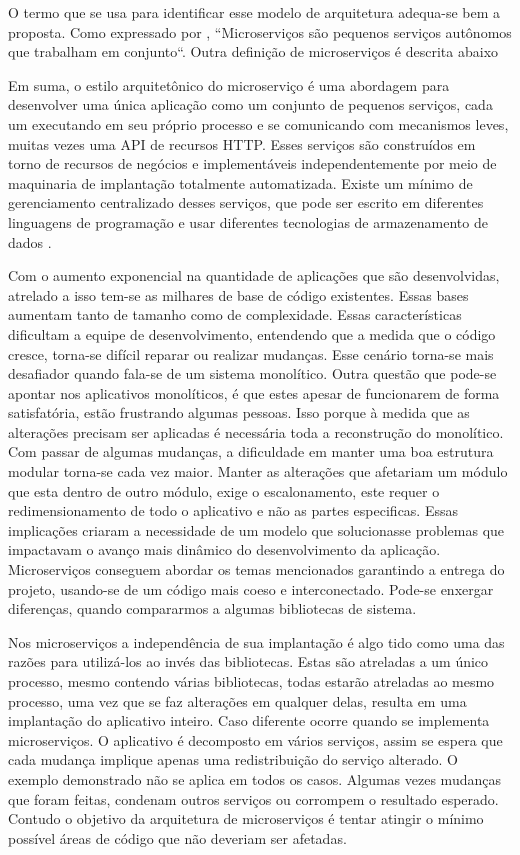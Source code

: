 O termo que se usa para identificar esse modelo de arquitetura adequa-se bem a proposta.
Como expressado por
\cite{building-microservices}, ``Microserviços são pequenos serviços autônomos que trabalham em conjunto``.
Outra definição de microserviços é descrita abaixo
\begin{citacao}
Em suma, o estilo arquitetônico do microserviço é uma abordagem para desenvolver
uma única aplicação como um conjunto de pequenos serviços, cada um executando em seu próprio processo e se comunicando
com mecanismos leves, muitas vezes uma API de recursos HTTP. Esses serviços são construídos em torno de recursos de
negócios e implementáveis independentemente por meio de maquinaria de implantação totalmente automatizada.
Existe um mínimo de gerenciamento centralizado desses serviços, que pode ser escrito em diferentes linguagens de
programação e usar diferentes tecnologias de armazenamento de dados \cite{martin-fowler-microservices}.
\end{citacao}

Com o aumento exponencial na quantidade de aplicações que são desenvolvidas, atrelado a isso tem-se as milhares de base
de código existentes. Essas bases aumentam tanto de tamanho como de complexidade. Essas características dificultam a
equipe de desenvolvimento, entendendo que a medida que o código cresce, torna-se difícil reparar ou realizar mudanças.
Esse cenário torna-se mais desafiador quando fala-se de um sistema monolítico. Outra questão que pode-se apontar
nos aplicativos monolíticos, é que estes apesar de funcionarem de forma satisfatória, estão frustrando algumas pessoas.
Isso porque à medida que as alterações precisam ser aplicadas é necessária toda a reconstrução do monolítico. Com passar
de algumas mudanças, a dificuldade em manter uma boa estrutura modular torna-se cada vez maior. Manter as alterações
que  afetariam um módulo que esta dentro de outro módulo, exige o escalonamento, este requer o redimensionamento de todo
o aplicativo e não as partes especificas. Essas implicações criaram a necessidade de um modelo que solucionasse problemas
que impactavam o avanço mais dinâmico do desenvolvimento da aplicação.
Microserviços conseguem abordar os temas mencionados garantindo a entrega do projeto, usando-se de um código mais coeso
e interconectado.  Pode-se enxergar diferenças, quando compararmos a algumas bibliotecas de sistema.


Nos microserviços a independência de sua implantação é algo tido como uma das razões para utilizá-los ao invés das
bibliotecas. Estas são atreladas a um único processo, mesmo contendo várias bibliotecas, todas estarão atreladas ao mesmo
processo, uma vez que se faz alterações em qualquer delas, resulta em uma implantação do aplicativo inteiro. Caso diferente
ocorre quando se implementa microserviços. O aplicativo é decomposto em vários serviços, assim se espera que cada mudança
implique apenas uma redistribuição do serviço alterado. O exemplo demonstrado não se aplica em todos os casos. Algumas
vezes mudanças que foram feitas, condenam outros serviços ou corrompem o resultado esperado. Contudo o objetivo da
arquitetura de microserviços é tentar atingir o mínimo possível áreas de código que não deveriam ser afetadas.


